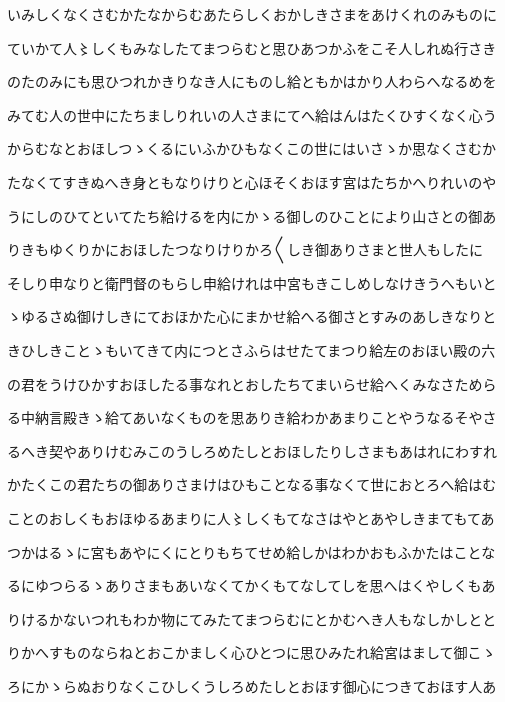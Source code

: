\documentclass[a4paper,11pt,landscape]{ltjtarticle}
\begin{document}
いみしくなくさむかたなからむあたらしくおかしきさまをあけくれのみものに
\par\medskip
ていかて人〻しくもみなしたてまつらむと思ひあつかふをこそ人しれぬ行さき
\par\medskip
のたのみにも思ひつれかきりなき人にものし給ともかはかり人わらへなるめを
\par\medskip
みてむ人の世中にたちましりれいの人さまにてへ給はんはたくひすくなく心う
\par\medskip
からむなとおほしつゝくるにいふかひもなくこの世にはいさゝか思なくさむか
\par\medskip
たなくてすきぬへき身ともなりけりと心ほそくおほす宮はたちかへりれいのや
\par\medskip
うにしのひてといてたち給けるを内にかゝる御しのひことにより山さとの御あ
\par\medskip
りきもゆくりかにおほしたつなりけりかろ〱しき御ありさまと世人もしたに
\par\medskip
そしり申なりと衛門督のもらし申給けれは中宮もきこしめしなけきうへもいと
\par\medskip
ゝゆるさぬ御けしきにておほかた心にまかせ給へる御さとすみのあしきなりと
\par\medskip
きひしきことゝもいてきて内につとさふらはせたてまつり給左のおほい殿の六
\par\medskip
の君をうけひかすおほしたる事なれとおしたちてまいらせ給へくみなさためら
\par\medskip
る中納言殿きゝ給てあいなくものを思ありき給わかあまりことやうなるそやさ
\par\medskip
るへき契やありけむみこのうしろめたしとおほしたりしさまもあはれにわすれ
\par\medskip
かたくこの君たちの御ありさまけはひもことなる事なくて世におとろへ給はむ
\par\medskip
ことのおしくもおほゆるあまりに人〻しくもてなさはやとあやしきまてもてあ
\par\medskip
つかはるゝに宮もあやにくにとりもちてせめ給しかはわかおもふかたはことな
\par\medskip
るにゆつらるゝありさまもあいなくてかくもてなしてしを思へはくやしくもあ
\par\medskip
りけるかないつれもわか物にてみたてまつらむにとかむへき人もなしかしとと
\par\medskip
りかへすものならねとおこかましく心ひとつに思ひみたれ給宮はまして御こゝ
\par\medskip
ろにかゝらぬおりなくこひしくうしろめたしとおほす御心につきておほす人あ
\par\medskip
\end{document}
